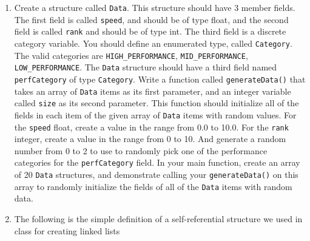 \documentclass[11pt]{article}
\begin{document}
\begin{enumerate}
\item Create a structure called \verb~Data~.  This structure should have 3
   member fields.  The first field is called \verb~speed~, and should be of
   type float, and the second field is called \verb~rank~ and should be of
   type int.  The third field is a discrete category variable.  You
   should define an enumerated type, called \verb~Category~.  The valid
   categories are \verb~HIGH_PERFORMANCE~, \verb~MID_PERFORMANCE~,
   \verb~LOW_PERFORMANCE~.  The \verb~Data~ structure should have a third field
   named \verb~perfCategory~ of type \verb~Category~.  Write a function called
   \verb~generateData()~ that takes an array of \verb~Data~ items as its first
   parameter, and an integer variable called \verb~size~ as its second
   parameter.  This function should initialize all of the fields in
   each item of the given array of \verb~Data~ items with random values.
   For the \verb~speed~ float, create a value in the range from 0.0 to
   10.0.  For the \verb~rank~ integer, create a value in the range from 0
   to 10. And generate a random number from 0 to 2 to use to randomly
   pick one of the performance categories for the \verb~perfCategory~
   field.  In your main function, create an array of 20 \verb~Data~
   structures, and demonstrate calling your \verb~generateData()~ on this
   array to randomly initialize the fields of all of the \verb~Data~ items
   with random data.
\item The following is the simple definition of a self-referential
   structure we used in class for creating linked lists


\end{enumerate}
\end{document}
